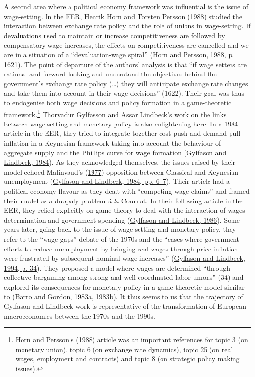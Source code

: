 \documentclass[]{elsarticle} %
\begin{document}
A second area where a political economy framework was influential is the
issue of wage-setting. In the EER, Henrik Horn and Torsten Persson
(\protect\hyperlink{ref-horn1988}{1988}) studied the interaction between
exchange rate policy and the role of unions in wage-setting. If
devaluations used to maintain or increase competitiveness are followed
by compensatory wage increases, the effects on competitiveness are
cancelled and we are in a situation of a ``devaluation-wage spiral''
(\protect\hyperlink{ref-horn1988}{Horn and Persson, 1988, p. 1621}). The
point of departure of the authors' analysis is that ``if wage setters
are rational and forward-looking and understand the objectives behind
the government's exchange rate policy (\ldots) they will anticipate
exchange rate changes and take them into account in their wage
decisions'' (1622). Their goal was thus to endogenise both wage
decisions and policy formation in a game-theoretic framework.\footnote{Horn
  and Persson's (\protect\hyperlink{ref-horn1988}{1988}) article was an
  important references for topic 3 (on monetary union), topic 6 (on
  exchange rate dynamics), topic 25 (on real wages, employment and
  contracts) and topic 8 (on strategic policy making issues).} Thorvadur
Gylfasson and Assar Lindbeck's work on the links between wage-setting
and monetary policy is also enlightening here. In a 1984 article in the
EER, they tried to integrate together cost push and demand pull
inflation in a Keynesian framework taking into account the behaviour of
aggregate supply and the Phillips curve for wage formation
(\protect\hyperlink{ref-gylfason1984}{Gylfason and Lindbeck, 1984}). As
they acknowledged themselves, the issues raised by their model echoed
Malinvaud's (\protect\hyperlink{ref-malinvaud1977}{1977}) opposition
between Classical and Keynesian unemployment
(\protect\hyperlink{ref-gylfason1984}{Gylfason and Lindbeck, 1984, pp.
6--7}). Their article had a political economy flavour as they dealt with
``competing wage claims'' and framed their model as a duopoly problem
\emph{à la} Cournot. In their following article in the EER, they relied
explicitly on game theory to deal with the interaction of wages
determination and government spending
(\protect\hyperlink{ref-gylfason1986}{Gylfason and Lindbeck, 1986}).
Some years later, going back to the issue of wage setting and monetary
policy, they refer to the ``wage gaps'' debate of the 1970s and the
``cases where government efforts to reduce unemployment by bringing real
wages through price inflation were frustrated by subsequent nominal wage
increases'' (\protect\hyperlink{ref-gylfason1994}{Gylfason and Lindbeck,
1994, p. 34}). They proposed a model where wages are determined
``through collective bargaining among strong and well coordinated labor
unions'' (34) and explored its consequences for monetary policy in a
game-theoretic model similar to (\protect\hyperlink{ref-barro1983}{Barro
and Gordon, 1983a}, \protect\hyperlink{ref-barro1983c}{1983b}). It thus
seems to us that the trajectory of Gylfason and Lindbeck work is
representative of the transformation of European macroeconomics between
the 1970s and the 1990s.
\end{document}
